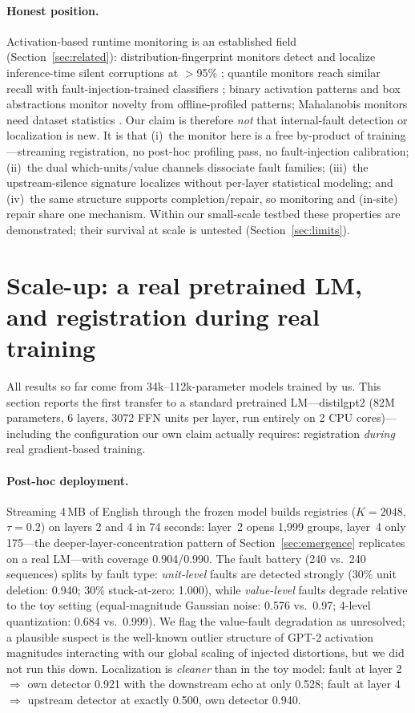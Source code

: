 \documentclass[11pt]{article}
\begin{document}
\paragraph{Honest position.} Activation-based runtime monitoring is an
established field (Section~\ref{sec:related}): distribution-fingerprint
monitors detect and localize inference-time silent corruptions at
$>$95\% \cite{drdna}; quantile monitors reach similar recall with
fault-injection-trained classifiers \cite{geissler}; binary activation
patterns \cite{cheng,olber} and box abstractions \cite{henzinger} monitor
novelty from offline-profiled patterns; Mahalanobis monitors need dataset
statistics \cite{lee}. Our claim is therefore \emph{not} that internal-fault
detection or localization is new. It is that (i)~the monitor here is a free
by-product of training---streaming registration, no post-hoc profiling pass,
no fault-injection calibration; (ii)~the dual which-units/value channels
dissociate fault families; (iii)~the upstream-silence signature localizes
without per-layer statistical modeling; and (iv)~the same structure supports
completion/repair, so monitoring and (in-site) repair share one mechanism.
Within our small-scale testbed these properties are demonstrated; their
survival at scale is untested (Section~\ref{sec:limits}).

\section{Scale-up: a real pretrained LM, and registration during real training}
\label{sec:realllm}

All results so far come from 34k--112k-parameter models trained by us. This
section reports the first transfer to a standard pretrained LM---distilgpt2
(82M parameters, 6 layers, 3072 FFN units per layer, run entirely on 2 CPU
cores)---including the configuration our own claim actually requires:
registration \emph{during} real gradient-based training.

\paragraph{Post-hoc deployment.} Streaming 4\,MB of English through the frozen
model builds registries ($K{=}2048$, $\tau{=}0.2$) on layers 2 and 4 in 74
seconds: layer~2 opens 1{,}999 groups, layer~4 only 175---the
deeper-layer-concentration pattern of Section~\ref{sec:emergence} replicates
on a real LM---with coverage 0.904/0.990. The fault battery (240 vs.\ 240
sequences) splits by fault type: \emph{unit-level} faults are detected
strongly (30\% unit deletion: 0.940; 30\% stuck-at-zero: 1.000), while
\emph{value-level} faults degrade relative to the toy setting (equal-magnitude
Gaussian noise: 0.576 vs.\ 0.97; 4-level quantization: 0.684 vs.\ 0.999). We
flag the value-fault degradation as unresolved; a plausible suspect is the
well-known outlier structure of GPT-2 activation magnitudes interacting with
our global scaling of injected distortions, but we did not run this down.
Localization is \emph{cleaner} than in the toy model: fault at layer 2
$\Rightarrow$ own detector 0.921 with the downstream echo at only 0.528;
fault at layer 4 $\Rightarrow$ upstream detector at exactly 0.500, own
detector 0.940.
\end{document}
